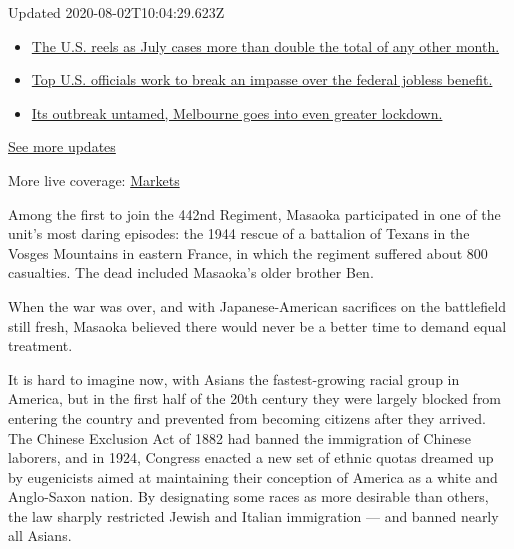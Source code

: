 Updated 2020-08-02T10:04:29.623Z

\begin{itemize}
\tightlist
\item
  \href{https://www.nytimes.com/2020/08/01/world/coronavirus-covid-19.html?action=click\&pgtype=Article\&state=default\&region=MAIN_CONTENT_1\&context=storylines_live_updates\#link-34047410}{The
  U.S. reels as July cases more than double the total of any other
  month.}
\item
  \href{https://www.nytimes.com/2020/08/01/world/coronavirus-covid-19.html?action=click\&pgtype=Article\&state=default\&region=MAIN_CONTENT_1\&context=storylines_live_updates\#link-780ec966}{Top
  U.S. officials work to break an impasse over the federal jobless
  benefit.}
\item
  \href{https://www.nytimes.com/2020/08/01/world/coronavirus-covid-19.html?action=click\&pgtype=Article\&state=default\&region=MAIN_CONTENT_1\&context=storylines_live_updates\#link-2bc8948}{Its
  outbreak untamed, Melbourne goes into even greater lockdown.}
\end{itemize}

\href{https://www.nytimes.com/2020/08/01/world/coronavirus-covid-19.html?action=click\&pgtype=Article\&state=default\&region=MAIN_CONTENT_1\&context=storylines_live_updates}{See
more updates}

More live coverage:
\href{https://www.nytimes.com/live/2020/07/31/business/stock-market-today-coronavirus?action=click\&pgtype=Article\&state=default\&region=MAIN_CONTENT_1\&context=storylines_live_updates}{Markets}

Among the first to join the 442nd Regiment, Masaoka participated in one
of the unit's most daring episodes: the 1944 rescue of a battalion of
Texans in the Vosges Mountains in eastern France, in which the regiment
suffered about 800 casualties. The dead included Masaoka's older brother
Ben.

When the war was over, and with Japanese-American sacrifices on the
battlefield still fresh, Masaoka believed there would never be a better
time to demand equal treatment.

It is hard to imagine now, with Asians the fastest-growing racial group
in America, but in the first half of the 20th century they were largely
blocked from entering the country and prevented from becoming citizens
after they arrived. The Chinese Exclusion Act of 1882 had banned the
immigration of Chinese laborers, and in 1924, Congress enacted a new set
of ethnic quotas dreamed up by eugenicists aimed at maintaining their
conception of America as a white and Anglo-Saxon nation. By designating
some races as more desirable than others, the law sharply restricted
Jewish and Italian immigration --- and banned nearly all Asians.

